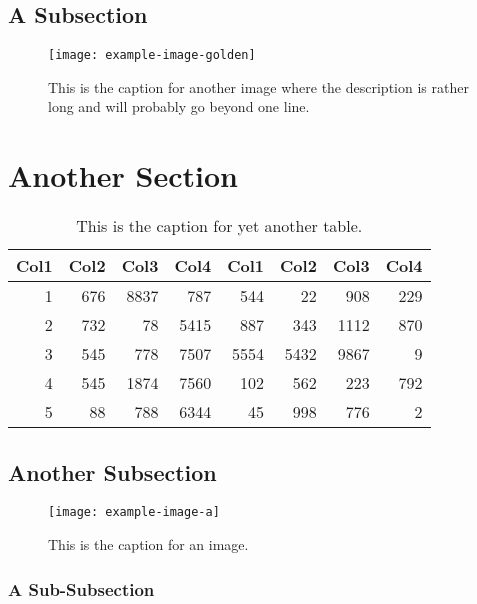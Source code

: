 \subsection{A Subsection}
    \lipsum[6-8]
    \begin{figure}
        \centering
        \texttt{[image: example-image-golden]}
        \captionsetup{width=4.5in}
        \caption{This is the caption for another image where the description is rather long and will probably go beyond one line.}
    \end{figure}

\section{Another Section}
    \lipsum[1-2]
    \begin{table}
        \centering
        \begin{tabular}{r r r r r r r r}
             Col1 & Col2 & Col3 & Col4 & Col1 & Col2 & Col3 & Col4 \\
             \hline
             1    & 676  & 8837 & 787  & 544  & 22   & 908  & 229  \\
             2    & 732  & 78   & 5415 & 887  & 343  & 1112 & 870  \\
             3    & 545  & 778  & 7507 & 5554 & 5432 & 9867 & 9    \\
             4    & 545  & 1874 & 7560 & 102  & 562  & 223  & 792  \\
             5    & 88   & 788  & 6344 & 45   & 998  & 776  & 2    \\
             \hline
        \end{tabular}
        \captionsetup{width=3.9in}
        \caption{This is the caption for yet another table.}
    \end{table}

\subsection{Another Subsection}
    \lipsum[3-5]
    \begin{figure}
        \centering
        \texttt{[image: example-image-a]}
        \captionsetup{width=3.5in}
        \caption{This is the caption for an image.}
    \end{figure}

\subsubsection{A Sub-Subsection}
    \lipsum[6-8]
